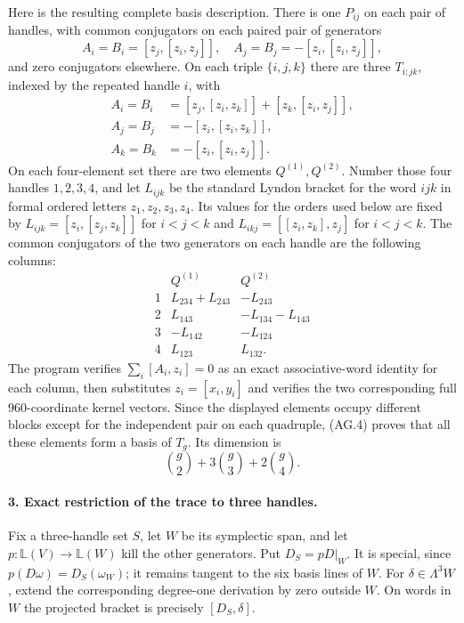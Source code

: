 Here is the resulting complete basis description.
There is one $P_{ij}$ on each pair of handles, with
common conjugators on each paired pair of generators
\[
 A_i=B_i=[z_j,[z_i,z_j]],\quad
 A_j=B_j=-[z_i,[z_i,z_j]],
\]
and zero conjugators elsewhere. On each triple
$\{i,j,k\}$ there are three $T_{i;jk}$, indexed
by the repeated handle $i$, with
\[
 \begin{split}
 A_i=B_i&=[z_j,[z_i,z_k]]+[z_k,[z_i,z_j]],\\
 A_j=B_j&=-[z_i,[z_i,z_k]],\\
 A_k=B_k&=-[z_i,[z_i,z_j]].
 \end{split}                                               \tag{AG.5}
\]
On each four-element set there are two elements
$Q^{(1)},Q^{(2)}$. Number those four handles
$1,2,3,4$, and let $L_{ijk}$ be the standard
Lyndon bracket for the word $ijk$ in formal
ordered letters $z_1,z_2,z_3,z_4$. Its values
for the orders used below are fixed by
$L_{ijk}=[z_i,[z_j,z_k]]$ for $i<j<k$ and
$L_{ikj}=[[z_i,z_k],z_j]$ for $i<j<k$.
The common conjugators of the two generators
on each handle are the following columns:
\[
\begin{array}{c|c|c}
 &Q^{(1)}&Q^{(2)}\\\hline
1&L_{234}+L_{243}&-L_{243}\\
2&L_{143}&-L_{134}-L_{143}\\
3&-L_{142}&-L_{124}\\
4&L_{123}&L_{132}.
\end{array}                                               \tag{AG.6}
\]
The program verifies $\sum_i[A_i,z_i]=0$ as an
exact associative-word identity for each column,
then substitutes $z_i=[x_i,y_i]$ and verifies the
two corresponding full $960$-coordinate kernel
vectors. Since the displayed elements occupy
different blocks except for the independent pair
on each quadruple, (AG.4) proves that all these
elements form a basis of $T_g$. Its dimension is
\[
                  \binom{g}{2}+3\binom{g}{3}+2\binom{g}{4}.
                                                               \tag{AG.7}
\]

\paragraph{3. Exact restriction of the trace to three handles.}
Fix a three-handle set $S$, let $W$ be its symplectic
span, and let $p:\mathbb L(V)\to\mathbb L(W)$ kill
the other generators. Put $D_S=pD|_W$.
It is special, since $p(D\omega)=D_S(\omega_W)$;
it remains tangent to the six basis lines of $W$.
For $\delta\in\Lambda^3W$, extend the corresponding
degree-one derivation by zero outside $W$.
On words in $W$ the projected bracket is precisely
$[D_S,\delta]$.

